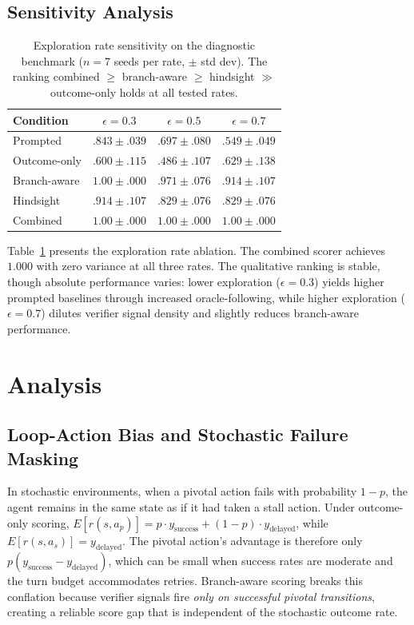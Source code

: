 \documentclass[11pt]{article}
\begin{document}
\subsection{Sensitivity Analysis}

\begin{table}[t]
\centering
\caption{Exploration rate sensitivity on the diagnostic benchmark ($n{=}7$ seeds per rate, $\pm$ std dev). The ranking combined $\geq$ branch-aware $\geq$ hindsight $\gg$ outcome-only holds at all tested rates.}
\label{tab:ablation}
\begin{tabular}{lccc}
\toprule
Condition & $\epsilon{=}0.3$ & $\epsilon{=}0.5$ & $\epsilon{=}0.7$ \\
\midrule
Prompted & $.843 \pm .039$ & $.697 \pm .080$ & $.549 \pm .049$ \\
Outcome-only & $.600 \pm .115$ & $.486 \pm .107$ & $.629 \pm .138$ \\
Branch-aware & $1.00 \pm .000$ & $.971 \pm .076$ & $.914 \pm .107$ \\
Hindsight & $.914 \pm .107$ & $.829 \pm .076$ & $.829 \pm .076$ \\
Combined & $1.00 \pm .000$ & $1.00 \pm .000$ & $1.00 \pm .000$ \\
\bottomrule
\end{tabular}
\end{table}

Table~\ref{tab:ablation} presents the exploration rate ablation. The combined scorer achieves $1.000$ with zero variance at all three rates. The qualitative ranking is stable, though absolute performance varies: lower exploration ($\epsilon{=}0.3$) yields higher prompted baselines through increased oracle-following, while higher exploration ($\epsilon{=}0.7$) dilutes verifier signal density and slightly reduces branch-aware performance.

\section{Analysis}

\subsection{Loop-Action Bias and Stochastic Failure Masking}

In stochastic environments, when a pivotal action fails with probability $1{-}p$, the agent remains in the same state as if it had taken a stall action. Under outcome-only scoring, $E[r(s, a_p)] = p \cdot y_{\text{success}} + (1{-}p) \cdot y_{\text{delayed}}$, while $E[r(s, a_s)] = y_{\text{delayed}}$. The pivotal action's advantage is therefore only $p(y_{\text{success}} - y_{\text{delayed}})$, which can be small when success rates are moderate and the turn budget accommodates retries. Branch-aware scoring breaks this conflation because verifier signals fire \emph{only on successful pivotal transitions}, creating a reliable score gap that is independent of the stochastic outcome rate.
\end{document}

